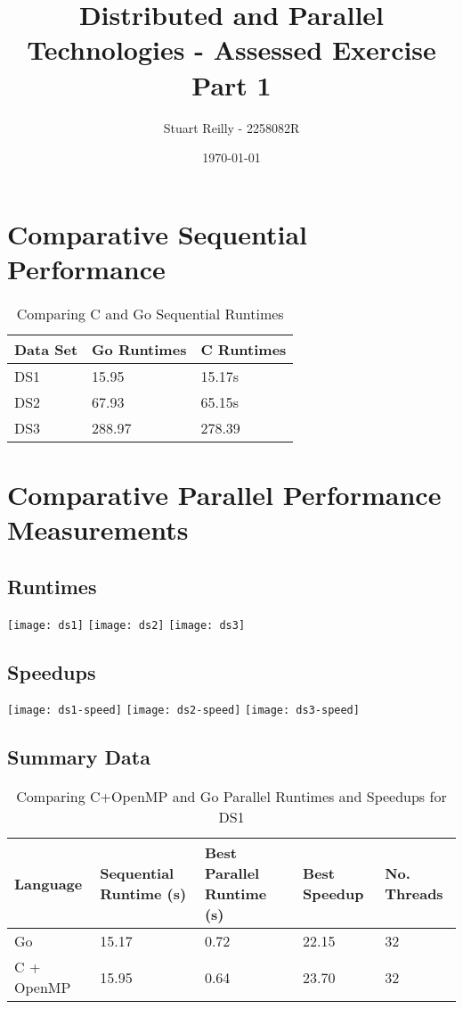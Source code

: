 \documentclass[11pt,a4paper,titlepage]{article}
\begin{document}
\title{Distributed and Parallel Technologies - Assessed Exercise Part 1}
\author{Stuart Reilly - 2258082R}
\date{\today}
\maketitle

\section{Comparative Sequential Performance}

\begin{table}[h]
	\centering
	\begin{tabular}{|l|l|l|}
		\hline
		Data Set & Go Runtimes & C Runtimes \\ \hline
		DS1 & 15.95 & 15.17s \\ \hline
		DS2 & 67.93 & 65.15s \\ \hline
		DS3 & 288.97 & 278.39 \\ \hline
	\end{tabular}
	\caption{Comparing C and Go Sequential Runtimes}
\end{table}

\section{Comparative Parallel Performance Measurements}
\subsection{Runtimes}

\texttt{[image: ds1]}
\texttt{[image: ds2]}
\texttt{[image: ds3]}

\subsection{Speedups}

\texttt{[image: ds1-speed]}
\texttt{[image: ds2-speed]}
\texttt{[image: ds3-speed]}

\subsection{Summary Data}

\begin{table}[!h]
	\centering
	\begin{tabulary}{\textwidth}{|L|L|L|L|L|}
		\hline
		Language & Sequential Runtime (s) & Best Parallel Runtime (s) & Best Speedup & No. Threads \\ \hline
		Go & 15.17 & 0.72 & 22.15 & 32 \\ \hline
		C + OpenMP & 15.95 & 0.64 & 23.70 & 32 \\ \hline
	\end{tabulary}
	\caption{Comparing C+OpenMP and Go Parallel Runtimes and Speedups for DS1}
\end{table}
\end{document}
